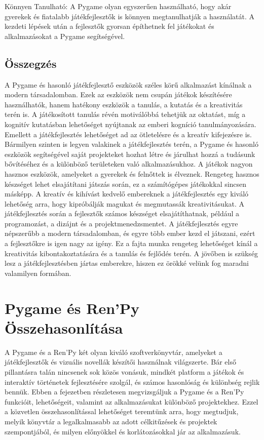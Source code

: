 Könnyen Tanulható:
A Pygame olyan egyszerűen használható, hogy akár gyerekek és fiatalabb játékfejlesztők is könnyen megtanulhatják a használatát. A kezdeti lépések után a fejlesztők gyorsan építhetnek fel játékokat és alkalmazásokat a Pygame segítségével.


\subsection{Összegzés}
A Pygame és hasonló játékfejlesztő eszközök széles körű alkalmazást kínálnak a modern társadalomban.
 Ezek az eszközök nem csupán játékok készítésére használhatók, hanem hatékony eszközök a tanulás,
  a kutatás és a kreativitás terén is. A játékosított tanulás révén motiválóbbá tehetjük az oktatást, 
  míg a kognitív kutatásban lehetőséget nyújtanak az emberi kogníció tanulmányozására.
   Emellett a játékfejlesztés lehetőséget ad az ötletelésre és a kreatív kifejezésre is.
    Bármilyen szinten is legyen valakinek a játékfejlesztés terén,
 a Pygame és hasonló eszközök segítségével saját projekteket hozhat létre és járulhat hozzá
  a tudásunk bővítéséhez és a különböző területeken való alkalmazásukhoz.
   A játékok nagyon hasznos eszközök, amelyeket a gyerekek és felnőttek is élveznek.
    Rengeteg hasznos készséget lehet elsajátítani játszás során, ez a számítógépes játékokkal sincsen másképp.
A kreatív és kihívást kedvelő embereknek a játékfejlesztés egy kiváló lehetőség arra,
 hogy kipróbálják magukat és megmutassák kreativitásukat.
  A játékfejlesztés során a fejlesztők számos készséget elsajátíthatnak, például a programozást,
a dizájnt és a projektmenedzsmentet. A játékfejlesztés egyre népszerűbb a modern társadalomban,
 és egyre több ember kezd el játszani, ezért a fejlesztőkre is igen nagy az igény. 
 Ez a fajta munka rengeteg lehetőséget kínál a kreativitás kibontakoztatására és a tanulás és fejlődés terén.
  A jövőben is szükség lesz a játékfejlesztésben jártas emberekre, hiszen ez örökké velünk
   fog maradni valamilyen formában.


\section{Pygame és Ren'Py Összehasonlítása}
A Pygame és a Ren'Py két olyan kiváló szoftverkönyvtár, amelyeket a játékfejlesztők és vizuális novellák készítői használnak világszerte. Bár első pillantásra talán nincsenek sok közös vonásuk, mindkét platform a játékok és interaktív történetek fejlesztésére szolgál, és számos hasonlóság és különbség rejlik bennük. Ebben a fejezetben részletesen megvizsgáljuk a Pygame és a Ren'Py funkcióit, lehetőségeit, valamint az alkalmazásukat különböző projektekhez. Ezzel a közvetlen összehasonlítással lehetőséget teremtünk arra, hogy megtudjuk, melyik könyvtár a legalkalmasabb az adott célkitűzések és projektek szempontjából, és milyen előnyökkel és korlátozásokkal jár az alkalmazásuk.

